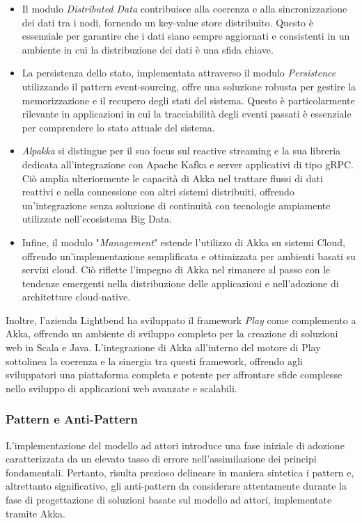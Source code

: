 \begin{itemize}
  \item Il modulo \textit{Distributed Data} contribuisce alla coerenza e alla sincronizzazione dei dati tra i nodi, fornendo un key-value store distribuito.
  Questo è essenziale per garantire che i dati siano sempre aggiornati e consistenti in un ambiente in cui la distribuzione dei dati è una sfida chiave.
  \item La persistenza dello stato, implementata attraverso il modulo \textit{Persistence} utilizzando il pattern event-sourcing, offre una soluzione robusta per gestire la memorizzazione e il recupero degli stati del sistema.
  Questo è particolarmente rilevante in applicazioni in cui la tracciabilità degli eventi passati è essenziale per comprendere lo stato attuale del sistema.
  \item \textit{Alpakka} si distingue per il suo focus sul reactive streaming e la sua libreria dedicata all'integrazione con Apache Kafka e server applicativi di tipo gRPC.
  Ciò amplia ulteriormente le capacità di Akka nel trattare flussi di dati reattivi e nella connessione con altri sistemi distribuiti, offrendo un'integrazione senza soluzione di continuità con tecnologie ampiamente utilizzate nell'ecosistema Big Data.
  \item Infine, il modulo "\textit{Management}" estende l'utilizzo di Akka su sistemi Cloud, offrendo un'implementazione semplificata e ottimizzata per ambienti basati su servizi cloud. 
  Ciò riflette l'impegno di Akka nel rimanere al passo con le tendenze emergenti nella distribuzione delle applicazioni e nell'adozione di architetture cloud-native.
\end{itemize}
Inoltre, l'azienda Lightbend ha sviluppato il framework \textit{Play} come complemento a Akka, offrendo un ambiente di sviluppo completo per la creazione di soluzioni web in Scala e Java.
L'integrazione di Akka all'interno del motore di Play sottolinea la coerenza e la sinergia tra questi framework, offrendo agli sviluppatori una piattaforma completa e potente per affrontare sfide complesse nello sviluppo di applicazioni web avanzate e scalabili.

\subsubsection[Pattern]{Pattern e Anti-Pattern}
L'implementazione del modello ad attori introduce una fase iniziale di adozione caratterizzata da un elevato tasso di errore nell'assimilazione dei principi fondamentali.
Pertanto, risulta prezioso delineare in maniera sintetica i pattern e, altrettanto significativo, gli anti-pattern da considerare attentamente durante la fase di progettazione di soluzioni basate sul modello ad attori, implementate tramite Akka.

